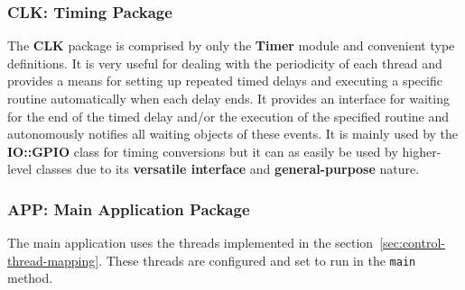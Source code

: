 
%
\subsubsection{CLK: Timing Package}
The \textbf{CLK} package is comprised by only the \textbf{Timer} module and convenient type definitions. It is very useful for dealing with the periodicity of each thread and provides a means for setting up repeated timed delays and executing a specific routine automatically when each delay ends. It provides an interface for waiting for the end of the timed delay and/or the execution of the specified routine and autonomously notifies all waiting objects of these events.
It is mainly used by the \textbf{IO::GPIO} class for timing conversions but it can as easily be used by higher-level classes due to its \textbf{versatile interface} and \textbf{general-purpose} nature.
%

%
\subsubsection{APP: Main Application Package}
%
The main application uses the threads implemented in the section~\ref{sec:control-thread-mapping}. These threads are configured and set to run in the \texttt{main} method.

